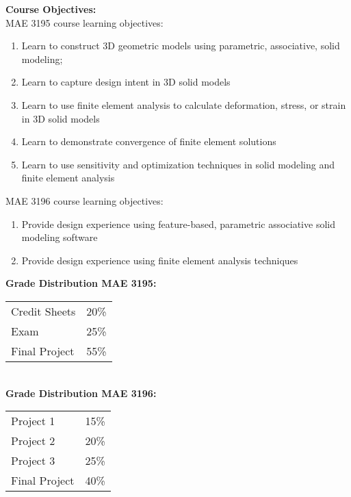 \documentclass[11pt]{article}
\begin{document}
\textbf {\large Course Objectives:} \\
MAE 3195 course learning objectives:
\begin{enumerate}%
    \item Learn to construct 3D geometric models using parametric, associative, solid modeling; 
    \item Learn to capture design intent in 3D solid models
    \item Learn to use finite element analysis to calculate deformation, stress, or strain in 3D solid models
    \item Learn to demonstrate convergence of finite element solutions
    \item Learn to use sensitivity and optimization techniques in solid modeling and finite element analysis
\end{enumerate}
MAE 3196 course learning objectives: 
\begin{enumerate}
    \item Provide design experience using feature-based, parametric associative solid modeling software
    \item Provide design experience using finite element analysis techniques
\end{enumerate}

\newpage
\textbf{\large Grade Distribution MAE 3195:} \\
\hspace*{40mm}
\begin{tabular}{ l l }
Credit Sheets & 20\% \\
Exam & 25\% \\
Final Project & 55\% \\
\end{tabular} \\

\textbf{\large Grade Distribution MAE 3196:} \\
\hspace*{40mm}
\begin{tabular}{ l l }
Project 1 & 15\% \\
Project 2 & 20\% \\
Project 3 & 25\% \\
Final Project & 40\% \\
\end{tabular} \\
\end{document}
